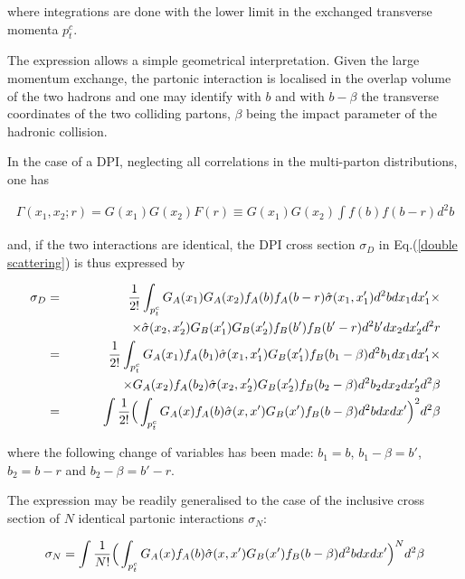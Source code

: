 \documentclass{ws-rv9x6}
\begin{document}
\noindent where integrations are done with the lower limit in the exchanged transverse momenta $p_t^c$. 

The expression allows a simple geometrical
interpretation. Given the large momentum exchange, 
the partonic interaction is localised in the overlap volume of the two
hadrons and one may identify with $b$ and with $b-\beta$ the transverse
coordinates of the two colliding partons, $\beta$ being the
impact parameter of the hadronic collision.

\noindent In the case of a DPI, neglecting all correlations in the multi-parton
distributions, one has 

\begin{eqnarray}
\Gamma(x_1,x_2;r)=G(x_1)G(x_2)F(r)\equiv G(x_1)G(x_2)\int f(b)f(b-r) d^2 b
\end{eqnarray}

\noindent
and, if the two interactions are identical, the DPI cross section $\sigma_D$ in Eq.(\ref{double scattering}) is thus expressed by

\begin{eqnarray}
\sigma_D&=&{1\over 2!}\int_{p_t^c} G_A(x_1)G_A(x_2)f_A(b)f_A(b-r)\hat{\sigma}(x_1,x_1')d^2bdx_1dx_1'\times\nonumber\\
&&\qquad\qquad\times
         \hat{\sigma}(x_2,x_2') G_B(x_1')G_B(x_2')f_B(b')f_B(b'-r)
         d^2b'dx_2dx_2'd^2r\nonumber\\
         &=&{1\over 2!}\int_{p_t^c} G_A(x_1)f_A(b_1)\hat{\sigma}(x_1,x_1')G_B(x_1')f_B(b_1-\beta)d^2b_1dx_1dx_1'\times\nonumber\\
&&\qquad\qquad\times
         G_A(x_2)f_A(b_2)\hat{\sigma}(x_2,x_2') G_B(x_2')f_B(b_2-\beta)
         d^2b_2dx_2dx_2'd^2\beta\nonumber\\
         &=&\int{1\over 2!}\Big(\int_{p_t^c} G_A(x)f_A(b)\hat{\sigma}(x,x')G_B(x')f_B(b-\beta)d^2bdxdx'\Big)^2d^2\beta
\end{eqnarray}

\noindent where the following change of variables has been made: $b_1=b$, $b_1-\beta=b'$, $b_2=b-r$ and $b_2-\beta=b'-r$.

The expression may be readily generalised to the case of the
inclusive cross section of $N$ identical partonic interactions $\sigma_N$:

\begin{eqnarray}
\sigma_N=\int{1\over N!}\Big(\int_{p_t^c} G_A(x)f_A(b)\hat{\sigma}(x,x')G_B(x')f_B(b-\beta)d^2bdxdx'\Big)^Nd^2\beta
\nonumber
\end{eqnarray}
\end{document}

